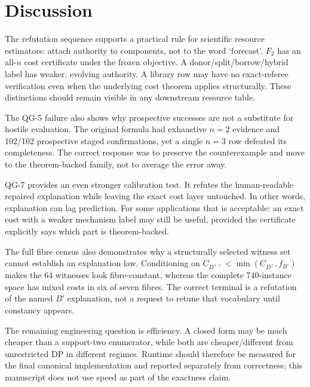 \section{Discussion}

The refutation sequence supports a practical rule for scientific resource estimators: attach authority to components, not to the word `forecast'. $F_2$ has an all-$n$ cost certificate under the frozen objective. A donor/split/borrow/hybrid label has weaker, evolving authority. A library row may have no exact-referee verification even when the underlying cost theorem applies structurally. These distinctions should remain visible in any downstream resource table.

The QG-5 failure also shows why prospective successes are not a substitute for hostile evaluation. The original formula had exhaustive $n=2$ evidence and 102/102 prospective staged confirmations, yet a single $n=3$ row defeated its completeness. The correct response was to preserve the counterexample and move to the theorem-backed family, not to average the error away.

QG-7 provides an even stronger calibration test. It refutes the human-readable repaired explanation while leaving the exact cost layer untouched. In other words, explanation can lag prediction. For some applications that is acceptable: an exact cost with a weaker mechanism label may still be useful, provided the certificate explicitly says which part is theorem-backed.

The full fibre census also demonstrates why a structurally selected witness set
cannot establish an explanation law. Conditioning on
$C_{D^{++}}<\min(C_{D^+},f_{B'})$ makes the 64 witnesses look fibre-constant,
whereas the complete 740-instance space has mixed costs in six of seven fibres.
The correct terminal is a refutation of the named $B'$ explanation, not a
request to retune that vocabulary until constancy appears.

The remaining engineering question is efficiency. A closed form may be much cheaper than a support-two enumerator, while both are cheaper/different from unrestricted DP in different regimes. Runtime should therefore be measured for the final canonical implementation and reported separately from correctness; this manuscript does not use speed as part of the exactness claim.
